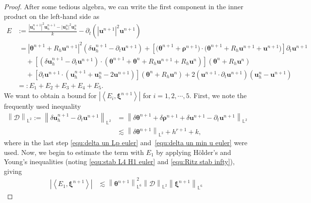 \documentclass[11pt, reqno]{amsart}
\theoremstyle{definition}
\theoremstyle{remark}
\numberwithin{equation}{section}
\newcommand{\bff}{\boldsymbol}
\newcommand{\bb}{\mathbb}
\newcommand{\norm}[2]{\left\|{#1}\right\|_{#2}}
\newcommand{\inpro}[2]{\left\langle#1,#2\right\rangle}
\newcommand{\abs}[1]{\left|{#1}\right|}
\begin{document}
\begin{proof}
	After some tedious algebra, we can write the first component in the inner product on the left-hand side as
	\begin{align}\label{equ:E id}
		\nonumber
		E 
		&:= 
		\frac{\abs{\bff{u}_h^{n+1}}^2 \bff{u}_h^{n+1}- \abs{\bff{u}_h^n}^2 \bff{u}_h^n}{k} - \partial_t \left(\abs{\bff{u}^{n+1}}^2 \bff{u}^{n+1}\right)
		\\
		\nonumber
		&\;=
		\abs{\bff{\theta}^{n+1}+ R_h \bff{u}^{n+1}}^2 \left(\delta \bff{u}_h^{n+1} - \partial_t \bff{u}^{n+1} \right)
		+
		\left[\big(\bff{\theta}^{n+1}+\bff{\rho}^{n+1}\big)\cdot \big(\bff{\theta}^{n+1}+R_h\bff{u}^{n+1}+\bff{u}^{n+1}\big)\right] \partial_t \bff{u}^{n+1}
		\\
		\nonumber
		&\;\quad
		+
		\left[\left(\delta \bff{u}_h^{n+1}- \partial_t \bff{u}^{n+1}\right)\cdot \left(\bff{\theta}^{n+1}+\bff{\theta}^n+ R_h\bff{u}^{n+1}+R_h\bff{u}^n\right) \right]
		\left(\bff{\theta}^n+R_h \bff{u}^n\right)
		\\
		\nonumber
		&\;\quad
		+
		\left[\partial_t \bff{u}^{n+1} \cdot \left(\bff{u}_h^{n+1}+\bff{u}_h^{n}-2\bff{u}^{n+1}\right)\right] \left(\bff{\theta}^n+R_h \bff{u}^n\right)
		+
		2 \left(\bff{u}^{n+1}\cdot \partial_t \bff{u}^{n+1}\right) \left(\bff{u}_h^n- \bff{u}^{n+1}\right)
		\\
		&=: E_1+E_2+E_3+E_4+E_5.
	\end{align}
	We want to obtain a bound for $\left|\inpro{E_i}{\bff{\xi}^{n+1}}\right|$ for $i=1,2,\cdots,5$. First, we note the frequently used inequality
	\begin{align}\label{equ:D est}
		\nonumber
		\norm{\mathcal{D}}{\bb{L}^2}
		:=
		\norm{\delta \bff{u}_h^{n+1} - \partial_t \bff{u}^{n+1}}{\bb{L}^2}
		&=
		\norm{\delta \bff{\theta}^{n+1}+\delta \bff{\rho}^{n+1}+\delta \bff{u}^{n+1}-\partial_t \bff{u}^{n+1}}{\bb{L}^2}
		\\
		&\lesssim
		\norm{\delta \bff{\theta}^{n+1}}{\bb{L}^2} + h^{r+1} + k,
	\end{align}
	where in the last step \eqref{equ:delta un Lp euler} and~\eqref{equ:delta un min u euler} were used.
	Now, we begin to estimate the term with $E_1$ by applying H\"older's and Young's inequalities (noting \eqref{equ:stab L4 H1 euler} and \eqref{equ:Ritz stab infty}), giving
	\begin{align}\label{equ:E1 euler}
		\nonumber
		\left|\inpro{E_1}{\bff{\xi}^{n+1}}\right|
		&\lesssim
		\norm{\bff{\theta}^{n+1}}{\bb{L}^6}^2 \norm{\mathcal{D}}{\bb{L}^2} \norm{\bff{\xi}^{n+1}}{\bb{L}^6}

\end{align}
\end{proof}
\end{document}
